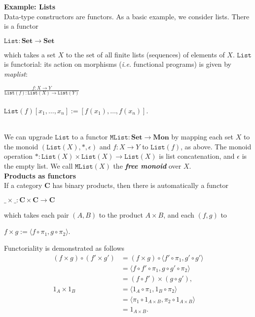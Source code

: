 \documentclass[]{amsbook}
\newcommand{\catname}[1]{\mathbf{#1}}
\newcommand{\0}{\mathbf{0}}
\newcommand{\1}{\mathbf{1}}
\newcommand{\dps}{\displaystyle}
\newcommand{\List}{\texttt{List}}
\begin{document}
\textbf{Example: Lists}\\
Data-type constructors are functors. As a basic example, we consider lists.
There is a functor
\begin{center}
    $\List : \catname{Set} \to \catname{Set}$
\end{center}
which takes a set $X$ to the set of all finite lists (sequences) of elements of
$X$. $\List$ is functorial: its action on morphisms (\emph{i.e.} functional
programs) is given by \emph{maplist}:\\
\begin{center}
    $\dps \frac{f: X \to Y}{\List(f): \List(X) \to \List(Y)}$\\~\\
    $\List(f)[x_1, \ldots, x_n] := [f(x_1), \ldots, f(x_n)]$.
\end{center}
~\\
We can upgrade $\List$ to a functor $\texttt{MList}: \catname{Set} \to
\catname{Mon}$ by mapping each set $X$ to the monoid $(\List(X), \ast,
\epsilon)$ and $f: X \to Y$ to $\List(f)$, as above. The monoid operation
$\ast: \List(X) \times \List(X) \to \List(X)$ is list concatenation, and
$\epsilon$ is the empty list. We call $\texttt{MList}(X)$ the
\emph{\textbf{free monoid}} over $X$.\\

\textbf{Products as functors}\\
If a category $\catname{C}$ has binary products, then there is automatically a
functor
\begin{center}
    $\_ \times \_ : \catname{C} \times \catname{C} \to \catname{C}$
\end{center}
which takes each pair $(A, B)$ to the product $A \times B$, and each $(f, g)$ to
\begin{center}
    $f \times g := \langle f \circ \pi_1, g \circ \pi_2 \rangle$.
\end{center}
Functoriality is demonstrated as follows
\begin{align*}
    (f \times g) \circ (f' \times g')
    &= (f \times g) \circ \langle f' \circ \pi_1, g' \circ g' \rangle \\
    &= \langle f \circ f' \circ \pi_1, g \circ g' \circ \pi_2 \rangle \\
    &= (f \circ f') \times (g \circ g'), \\
    1_A \times 1_B
    &= \langle 1_A \circ \pi_1, 1_B \circ \pi_2 \rangle \\
    &= \langle \pi_1 \circ 1_{A \times B}, \pi_2 \circ 1_{A \times B} \rangle \\
    &= 1_{A \times B}.
\end{align*}
~\\
\end{document}
